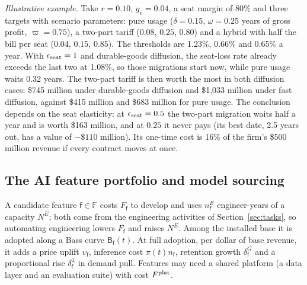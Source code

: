 \noindent\emph{Illustrative example.} Take $r=0.10$, $g_v=0.04$, a seat margin of 80\% and three targets with scenario parameters: pure usage ($\delta=0.15$, $\omega=0.25$ years of gross profit, $\varpi=0.75$), a two-part tariff ($0.08$, $0.25$, $0.80$) and a hybrid with half the bill per seat ($0.04$, $0.15$, $0.85$). The thresholds are 1.23\%, 0.66\% and 0.65\% a year. With $\epsilon_{\rm seat}=1$ and durable-goods diffusion, the seat-loss rate already exceeds the last two at 1.08\%, so those migrations start now, while pure usage waits 0.32 years. The two-part tariff is then worth the most in both diffusion cases: \$745 million under durable-goods diffusion and \$1{,}033 million under fast diffusion, against \$415 million and \$683 million for pure usage. The conclusion depends on the seat elasticity: at $\epsilon_{\rm seat}=0.5$ the two-part migration waits half a year and is worth \$163 million, and at $0.25$ it never pays (its best date, 2.5 years out, has a value of $-\$110$ million). Its one-time cost is 16\% of the firm's \$500 million revenue if every contract moves at once.

\subsection{The AI feature portfolio and model sourcing}\label{sec:product-portfolio}

A candidate feature $\mathsf f\in\mathbb F$ costs $F_{\mathsf f}$ to develop and uses $n^E_{\mathsf f}$ engineer-years of a capacity $N^E$; both come from the engineering activities of Section~\ref{sec:tasks}, so automating engineering lowers $F_{\mathsf f}$ and raises $N^E$. Among the installed base it is adopted along a Bass curve $\mathsf B_{\mathsf f}(t)$. At full adoption, per dollar of base revenue, it adds a price uplift $\upsilon_{\mathsf f}$, inference cost $\pi(t)n_{\mathsf f}$, retention growth $\delta^G_{\mathsf f}$ and a proportional rise $\delta^\lambda_{\mathsf f}$ in demand pull. Features may need a shared platform (a data layer and an evaluation suite) with cost $F^{\rm plat}$.

